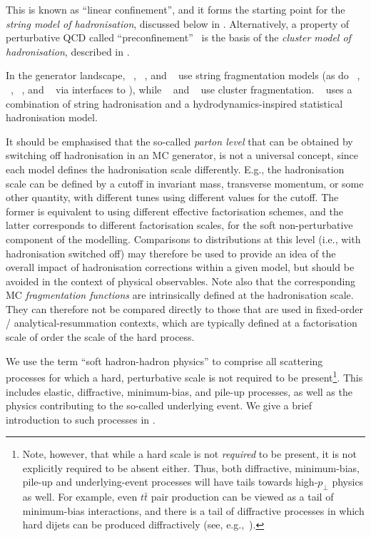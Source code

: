 %
This is known as ``linear confinement'', and it forms the starting
point for the \emph{string model of hadronisation}, discussed below in
. 
%
%
Alternatively, a property of 
perturbative QCD called ``preconfinement''~\cite{Amati:1979fg} 
is the basis of the 
\emph{cluster model of hadronisation}, described in
\cite{Buckley:2011ms,pdg2012}. 

%
%
%
In the generator landscape,
\Py~\cite{Sjostrand:2006za,Sjostrand:2014zea}, \Qgsjet~\cite{Ostapchenko:2007qb}, and \Sibyll~\cite{Riehn:2015oba}
use string fragmentation models (as do \Ar~\cite{Lonnblad:1992tz}, \Dpmjet~\cite{Bopp:2005cr},
\Phojet~\cite{Bopp:1998rc}, and \Vc~\cite{Fischer:2016vfv} via interfaces to \Py), while
\Hw~\cite{Bellm:2015jjp} and \Sh~\cite{Gleisberg:2008ta} use cluster fragmentation. \Epos~\cite{Pierog:2013ria} uses a combination of
string hadronisation and a hydrodynamics-inspired statistical
hadronisation model.

%
%
It should be emphasised that the so-called \emph{parton level}
that can be obtained by switching off hadronisation in
an MC generator, is not a universal concept, 
since each model defines the hadronisation scale 
differently. E.g., the hadronisation scale can be defined by a cutoff
in invariant mass, transverse momentum, or some other quantity, 
with different tunes using different values for the cutoff. The former
is equivalent to using different effective factorisation schemes, and
the latter corresponds to different factorisation scales, for the soft
non-perturbative component of the modelling. 
Comparisons to
distributions at this level (i.e., with hadronisation switched off) 
may therefore be used to provide an idea of the 
overall impact of hadronisation corrections within a given model, 
but should be avoided in the context of physical observables.
%
Note also that the corresponding MC \emph{fragmentation functions} 
are intrinsically defined at the hadronisation scale. They can
therefore not be compared directly to those that are 
used in fixed-order / analytical-resummation contexts, which are
typically defined at a factorisation scale of order the scale of the
hard process.

We use the term ``soft hadron-hadron physics'' to 
comprise all scattering processes for which a hard, perturbative scale
is not required to be present\footnote{Note, however,
that while a hard scale is not \emph{required} to be present, 
it is not explicitly required to be absent either. 
Thus, both diffractive, minimum-bias, pile-up and
underlying-event processes will have tails towards high-$p_\perp$ 
 physics as well. For example, even $t\bar{t}$ pair production
   can be viewed as a tail of minimum-bias interactions, and there is
   a tail of diffractive processes in which hard dijets can be
   produced diffractively (see, e.g.,~\cite{Navin:2010kk}).}.
This includes elastic, diffractive, minimum-bias, and pile-up
processes, as well as the
physics contributing to the so-called underlying event. We 
give a brief introduction to such processes
in . 

